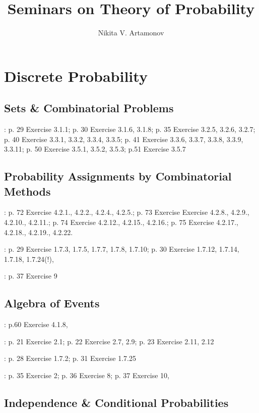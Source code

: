 \documentclass[12pt]{article}
\title{Seminars on Theory of Probability}
\author{Nikita V. Artamonov}
\begin{document}
\maketitle

\section{Discrete Probability}

\subsection{Sets \& Combinatorial Problems}
\cite{Schay}: p. 29 Exercise 3.1.1; p. 30 Exercise 3.1.6, 3.1.8;
p. 35 Exercise 3.2.5, 3.2.6, 3.2.7;
p. 40 Exercise 3.3.1, 3.3.2, 3.3.4, 3.3.5;
p. 41 Exercise 3.3.6, 3.3.7, 3.3.8, 3.3.9, 3.3.11;
p. 50 Exercise 3.5.1, 3.5.2, 3.5.3; p.51 Exercise 3.5.7 

\subsection{Probability Assignments by Combinatorial Methods}

\cite{Schay}: p. 72 Exercise 4.2.1., 4.2.2., 4.2.4., 4.2.5.;
p. 73 Exercise Exercise 4.2.8., 4.2.9., 4.2.10., 4.2.11.;
p. 74 Exercise 4.2.12., 4.2.15., 4.2.16.;
p. 75 Exercise 4.2.17., 4.2.18., 4.2.19., 4.2.22.

\noindent\cite{Meester}: p. 29 Exercise 1.7.3,  1.7.5,
1.7.7, 1.7.8, 1.7.10;  p. 30 Exercise 1.7.12, 1.7.14, 1.7.18,
1.7.24(!), 

\noindent\cite{Mittelhammer}: p. 37 Exercise 9

\subsection{Algebra of Events}

\cite{Schay}: p.60  Exercise 4.1.8, 

\noindent\cite{Dekking}: p. 21 Exercise 2.1; p. 22 Exercise 2.7, 2.9;
p. 23 Exercise 2.11, 2.12

\noindent\cite{Meester}:  p. 28 Exercise 1.7.2; p. 31 Exercise 1.7.25

\noindent\cite{Mittelhammer}: p. 35 Exercise 2; p. 36 Exercise 8;
p. 37 Exercise 10, 

\subsection{Independence \& Conditional Probabilities}
\end{document}
